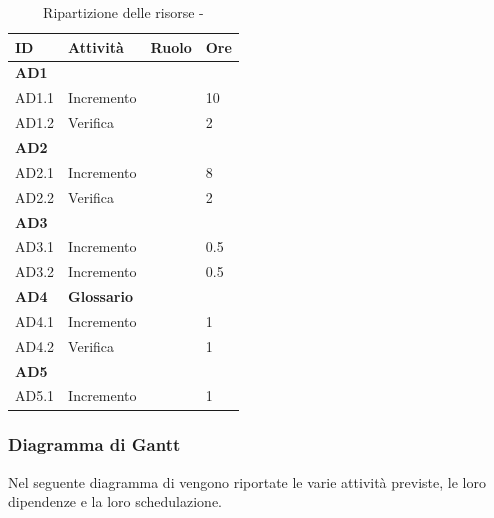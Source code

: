 \documentclass[12pt,a4paper]{article}
\begin{document}
\begin{table}[H]
	\begin{center}
		\begin{tabular}{p{} p{} p{} p{}}
			\toprule
			\textbf{ID}	& \textbf{Attività}	& \textbf{Ruolo} & \textbf{Ore}\\ \midrule
			\midrule
			\textbf{AD1} & \textbf{\AdR{}} & &  \\ \midrule
			AD1.1 & Incremento & \AN{} & 10 \\ \midrule
			AD1.2 & Verifica & \VR{} & 2 \\ \midrule
			\textbf{AD2} & \textbf{\NdP{}} &  &  \\ \midrule
			AD2.1 & Incremento & \AM{} & 8 \\ \midrule
			AD2.2 & Verifica & \VR{} & 2 \\ \midrule
			\textbf{AD3} & \textbf{\PdQ{}} & &  \\ \midrule
			AD3.1 & Incremento & \RE{} & 0.5 \\ \midrule
			AD3.2 & Incremento & \RE{} & 0.5 \\ \midrule
			\textbf{AD4} & \textbf{Glossario} & &  \\ \midrule
			AD4.1 & Incremento & \VR{} & 1 \\ \midrule
			AD4.2 & Verifica & \VR{} & 1 \\ \midrule
			\textbf{AD5} & \textbf{\PdP{}} & &  \\ \midrule
			AD5.1 & Incremento & \RE{} & 1 \\ \midrule
			\bottomrule
		\end{tabular}
		\caption{Ripartizione delle risorse - \FAD{}}
	\end{center}
\end{table}

\subsubsection{Diagramma di Gantt}
\label{gantt analisi di dettaglio}
Nel seguente diagramma di  vengono riportate le varie attività previste, le loro dipendenze e la loro schedulazione.
\end{document}
